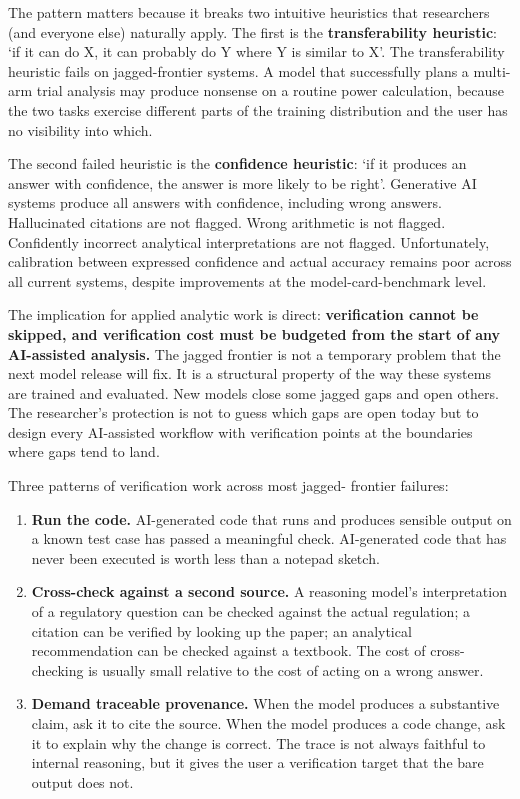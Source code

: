 \documentclass[
  letterpaper,
  11pt]{scrbook}
\begin{document}
The pattern matters because it breaks two intuitive heuristics that
researchers (and everyone else) naturally apply. The first is the
\textbf{transferability heuristic}: `if it can do X, it can probably do
Y where Y is similar to X'. The transferability heuristic fails on
jagged-frontier systems. A model that successfully plans a multi-arm
trial analysis may produce nonsense on a routine power calculation,
because the two tasks exercise different parts of the training
distribution and the user has no visibility into which.

The second failed heuristic is the \textbf{confidence heuristic}: `if it
produces an answer with confidence, the answer is more likely to be
right'. Generative AI systems produce all answers with confidence,
including wrong answers. Hallucinated citations are not flagged. Wrong
arithmetic is not flagged. Confidently incorrect analytical
interpretations are not flagged. Unfortunately, calibration between
expressed confidence and actual accuracy remains poor across all current
systems, despite improvements at the model-card-benchmark level.

The implication for applied analytic work is direct:
\textbf{verification cannot be skipped, and verification cost must be
budgeted from the start of any AI-assisted analysis.} The jagged
frontier is not a temporary problem that the next model release will
fix. It is a structural property of the way these systems are trained
and evaluated. New models close some jagged gaps and open others. The
researcher's protection is not to guess which gaps are open today but to
design every AI-assisted workflow with verification points at the
boundaries where gaps tend to land.

Three patterns of verification work across most jagged- frontier
failures:

\begin{enumerate}
\def\labelenumi{\arabic{enumi}.}
\item
  \textbf{Run the code.} AI-generated code that runs and produces
  sensible output on a known test case has passed a meaningful check.
  AI-generated code that has never been executed is worth less than a
  notepad sketch.
\item
  \textbf{Cross-check against a second source.} A reasoning model's
  interpretation of a regulatory question can be checked against the
  actual regulation; a citation can be verified by looking up the paper;
  an analytical recommendation can be checked against a textbook. The
  cost of cross-checking is usually small relative to the cost of acting
  on a wrong answer.
\item
  \textbf{Demand traceable provenance.} When the model produces a
  substantive claim, ask it to cite the source. When the model produces
  a code change, ask it to explain why the change is correct. The trace
  is not always faithful to internal reasoning, but it gives the user a
  verification target that the bare output does not.
\end{enumerate}
\end{document}
